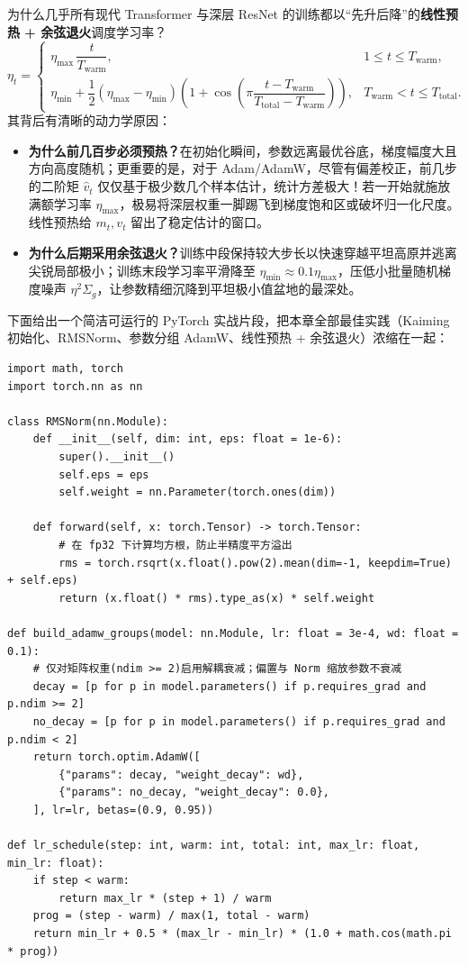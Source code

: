 为什么几乎所有现代 Transformer 与深层 ResNet 的训练都以“先升后降”的\textbf{线性预热 + 余弦退火}调度学习率？
\begin{equation}
  \eta_t = \begin{cases}
    \eta_{\max}\,\dfrac{t}{T_{\text{warm}}}, & 1 \le t \le T_{\text{warm}}, \\[6pt]
    \eta_{\min} + \dfrac{1}{2}\left(\eta_{\max} - \eta_{\min}\right)\left(1 + \cos\!\left(\pi \dfrac{t - T_{\text{warm}}}{T_{\text{total}} - T_{\text{warm}}}\right)\right), & T_{\text{warm}} < t \le T_{\text{total}}.
  \end{cases}
  \label{eq:warmup-cosine}
\end{equation}
其背后有清晰的动力学原因：
\begin{itemize}
  \item \textbf{为什么前几百步必须预热？}在初始化瞬间，参数远离最优谷底，梯度幅度大且方向高度随机；更重要的是，对于 Adam/AdamW，尽管有偏差校正，前几步的二阶矩 $\hat{v}_t$ 仅仅基于极少数几个样本估计，统计方差极大！若一开始就施放满额学习率 $\eta_{\max}$，极易将深层权重一脚踢飞到梯度饱和区或破坏归一化尺度。线性预热给 $m_t, v_t$ 留出了稳定估计的窗口。
  \item \textbf{为什么后期采用余弦退火？}训练中段保持较大步长以快速穿越平坦高原并逃离尖锐局部极小；训练末段学习率平滑降至 $\eta_{\min} \approx 0.1\eta_{\max}$，压低小批量随机梯度噪声 $\eta^2 \Sigma_g$，让参数精细沉降到平坦极小值盆地的最深处。
\end{itemize}

下面给出一个简洁可运行的 PyTorch 实战片段，把本章全部最佳实践（Kaiming 初始化、RMSNorm、参数分组 AdamW、线性预热 + 余弦退火）浓缩在一起：

\begin{lstlisting}[caption={现代深层网络训练配置的标准模板：RMSNorm + 参数分组 AdamW + 余弦预热}]
import math, torch
import torch.nn as nn

class RMSNorm(nn.Module):
    def __init__(self, dim: int, eps: float = 1e-6):
        super().__init__()
        self.eps = eps
        self.weight = nn.Parameter(torch.ones(dim))

    def forward(self, x: torch.Tensor) -> torch.Tensor:
        # 在 fp32 下计算均方根，防止半精度平方溢出
        rms = torch.rsqrt(x.float().pow(2).mean(dim=-1, keepdim=True) + self.eps)
        return (x.float() * rms).type_as(x) * self.weight

def build_adamw_groups(model: nn.Module, lr: float = 3e-4, wd: float = 0.1):
    # 仅对矩阵权重(ndim >= 2)启用解耦衰减；偏置与 Norm 缩放参数不衰减
    decay = [p for p in model.parameters() if p.requires_grad and p.ndim >= 2]
    no_decay = [p for p in model.parameters() if p.requires_grad and p.ndim < 2]
    return torch.optim.AdamW([
        {"params": decay, "weight_decay": wd},
        {"params": no_decay, "weight_decay": 0.0},
    ], lr=lr, betas=(0.9, 0.95))

def lr_schedule(step: int, warm: int, total: int, max_lr: float, min_lr: float):
    if step < warm:
        return max_lr * (step + 1) / warm
    prog = (step - warm) / max(1, total - warm)
    return min_lr + 0.5 * (max_lr - min_lr) * (1.0 + math.cos(math.pi * prog))
\end{lstlisting}

